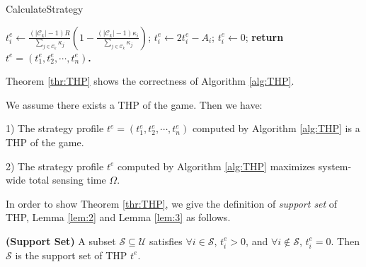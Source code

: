 \documentclass{IEEEtran}
\begin{document}
\begin{algorithm}[!t]
\begin{small}
\begin{algorithmic}[1]
\end{algorithmic}
\end{small}
\end{algorithm}


\begin{algorithm}[t]
\begin{small}
\caption{\textsf{CalculateStrategy}}
\label{alg:calc_strategy}
\renewcommand{\algorithmicrequire}{\textbf{Input:}}
\renewcommand{\algorithmicensure}{\textbf{Output:}}
\begin{algorithmic}[1]
		\State $t_i^{e} \leftarrow \frac{(|\mathcal{C}_k|-1)R}{\sum_{j\in\mathcal{C}_k}\kappa_j}(1-\frac{(|\mathcal{C}_k|-1)\kappa_i}{\sum_{j\in\mathcal{C}_k}\kappa_j})$;
			\State $t_i^{e} \leftarrow 2t_i^{e}-A_i$;
		\EndIf
		\Else
		\State $t_i^{e} \leftarrow 0$;
	\EndIf
\EndFor
\State \bf{return} $t^e=(t_1^{e},t_2^{e},\cdots,t_n^{e})$.
\end{algorithmic}
\end{small}
\end{algorithm}


Theorem \ref{thr:THP} shows the correctness of Algorithm \ref{alg:THP}.


\begin{theorem}
\label{thr:THP}
We assume there exists a THP of the game. Then we have:\par{}
1) The strategy profile $t^{e}=(t_1^{e},t_2^{e},\cdots,t_n^{e})$ computed by Algorithm \ref{alg:THP} is a THP of the game.\par{}
2) The strategy profile $t^{e}$ computed by Algorithm \ref{alg:THP} maximizes system-wide total sensing time $\Omega$.
\end{theorem}

In order to show Theorem \ref{thr:THP}, we give the definition of \emph{support set} of THP, Lemma \ref{lem:2} and Lemma \ref{lem:3} as follows. 

\begin{definition}
\label{def:support_set}
{\bf (Support Set)} A subset $\mathcal{S}\subseteq\mathcal{U}$ satisfies $\forall i\in\mathcal{S}$, $t_i^{e}>0$, and $\forall i\notin\mathcal{S}$, $t_i^{e}=0$. Then $\mathcal{S}$ is the support set of THP $t^{e}$.
\end{definition}
\end{document}
